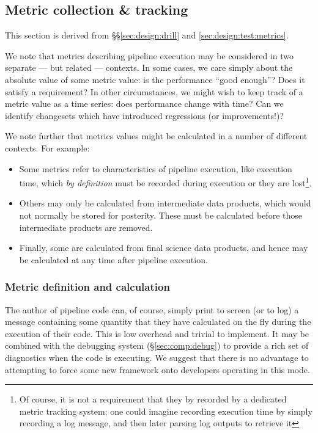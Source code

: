 \subsection{Metric collection \& tracking}
\label{sec:comp:metric}

This section is derived from \S\S\ref{sec:design:drill} and \ref{sec:design:test:metrics}.

We note that metrics describing pipeline execution may be considered in two separate --- but related --- contexts.
In some cases, we care simply about the absolute value of some metric value: is the performance ``good enough''?
Does it satisfy a requirement?
In other circumstances, we might wish to keep track of a metric value as a time series: does performance change with time?
Can we identify changesets which have introduced regressions (or improvements!)?

We note further that metrics values might be calculated in a number of different contexts.
For example:

\begin{itemize}

  \item{Some metrics refer to characteristics of pipeline execution, like execution time, which \emph{by definition} must be recorded during execution or they are lost\footnote{Of course, it is not a requirement that they by recorded by a dedicated metric tracking system; one could imagine recording execution time by simply recording a log message, and then later parsing log outputs to retrieve it}.}

  \item{Others may only be calculated from intermediate data products, which would not normally be stored for posterity. These must be calculated before those intermediate products are removed.}

  \item{Finally, some are calculated from final science data products, and hence may be calculated at any time after pipeline execution.}

\end{itemize}

\subsubsection{Metric definition and calculation}
\label{sec:comp:metric:define}

The author of pipeline code can, of course, simply print to screen (or to log) a message containing some quantity that they have calculated on the fly during the execution of their code.
This is low overhead and trivial to implement.
It may be combined with the debugging system (\S\ref{sec:comp:debug}) to provide a rich set of diagnostics when the code is executing.
We suggest that there is no advantage to attempting to force some new framework onto developers operating in this mode.

